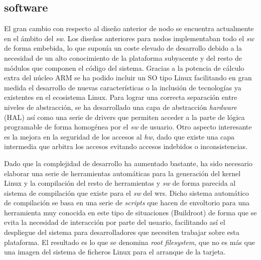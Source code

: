 \subsection{software}

El gran cambio con respecto al diseño anterior de nodo se encuentra actualmente 
en el ámbito del \textit{sw}. Los diseños anteriores para nodos implementaban 
todo el \textit{sw} de forma embebida, lo que suponía un coste elevado de 
desarrollo debido a la necesidad de un alto conocimiento de la plataforma 
subyacente y del resto de módulos que componen el código del sistema. Gracias a 
la potencia de cálculo extra del núcleo ARM se ha podido incluir un SO tipo 
Linux facilitando en gran medida el desarrollo de nuevas características o la 
inclusión de tecnologías ya existentes en el ecosistema Linux. Para lograr una 
correcta separación entre niveles de abstracción, se ha desarrollado una capa 
de abstracción \textit{hardware} (HAL) así como una serie de drivers que 
permiten acceder a la parte de lógica programable de forma homogénea por el 
\textit{sw} de usuario. Otro aspecto interesante es la mejora en la seguridad 
de los accesos al \textit{hw}, dado que existe una capa intermedia que arbitra 
los accesos evitando accesos indebidos o inconsistencias.

Dado que la complejidad de desarrollo ha aumentado bastante, ha sido necesario 
elaborar una serie de herramientas automáticas para la generación del kernel 
Linux y la compilación del resto de herramientas y \textit{sw} de forma 
parecida al sistema de compilación que existe para el \textit{sw} del 
\gls{wrs}. Dicho sistema automático de compilación se basa en una serie de 
\textit{scripts} que hacen de envoltorio para una herramienta muy conocida en 
este tipo de situaciones (Buildroot) de forma que se evita la necesidad de 
interacción por parte del usuario, facilitando así el despliegue del sistema 
para desarrolladores que necesiten trabajar sobre esta plataforma. El resultado 
es lo que se denomina \textit{root filesystem}, que no es más que una imagen 
del sistema de ficheros Linux para el arranque de la tarjeta.

